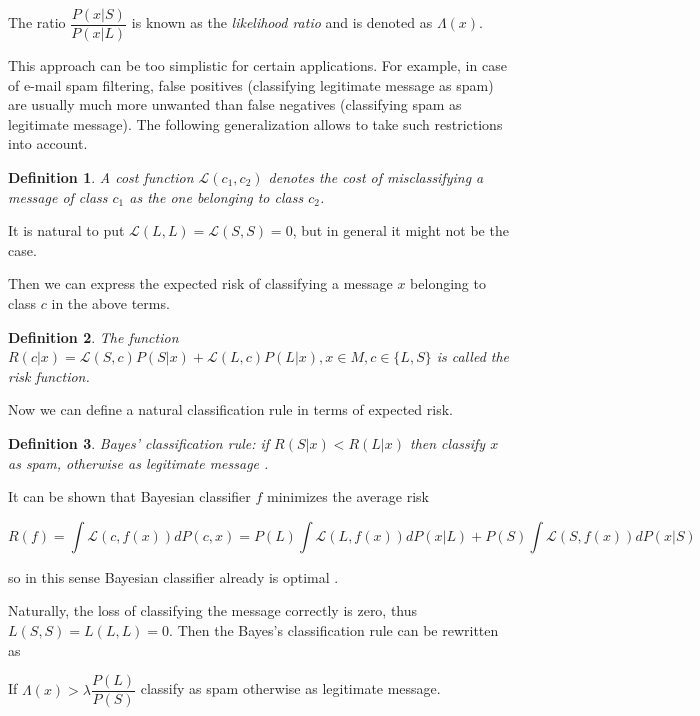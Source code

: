 \documentclass[12pt]{report}
\newcommand{\Loss}{\mathcal{L}}
\newtheorem{definition}{Definition}[section]
\begin{document}
The ratio $\dfrac{P(x | S)}{P(x | L)}$ is known as the \textit{likelihood ratio} and is denoted as $\Lambda(x)$.

This approach can be too simplistic for certain applications. For example, in case of e-mail spam filtering, false positives (classifying legitimate message as spam) are usually much more unwanted than false negatives (classifying spam as legitimate message). The following generalization allows to take such restrictions into account.

\begin{definition}
	A cost function $\Loss(c_1, c_2)$ denotes the cost of misclassifying a message of class $c_1$ as the one belonging to class $c_2$.
\end{definition}

It is natural to put $\Loss(L, L) = \Loss(S, S) = 0$, but in general it might not be the case.

Then we can express the expected risk of classifying a message $x$ belonging to class $c$ in the above terms.

\begin{definition}
	The function $R(c | x) = \Loss(S, c) P(S |x) + \Loss(L, c) P(L | x), x \in M, c \in \{L, S\}$ is called the risk function.
\end{definition}

Now we can define a natural classification rule in terms of expected risk.

\begin{definition}
	Bayes' classification rule: if $R(S | x) < R(L | x)$ then classify $x$ as spam, otherwise as legitimate message \cite{Kecman}.
\end{definition}

It can be shown that Bayesian classifier $f$ minimizes the average risk

$$R(f) = \int \Loss(c, f(x)) dP(c, x) = P(L) \int \Loss(L, f(x))dP(x | L) + P(S) \int \Loss(S, f(x))dP(x | S)$$

so in this sense Bayesian classifier already is optimal \cite{Tretyakov}.

Naturally, the loss of classifying the message correctly is zero, thus $L(S, S) = L(L, L) = 0$. Then the Bayes's classification rule can be rewritten as

\begin{center}
	If $\Lambda(x) > \lambda \dfrac{P(L)}{P(S)}$ classify as spam otherwise as legitimate message.
\end{center}
\end{document}
